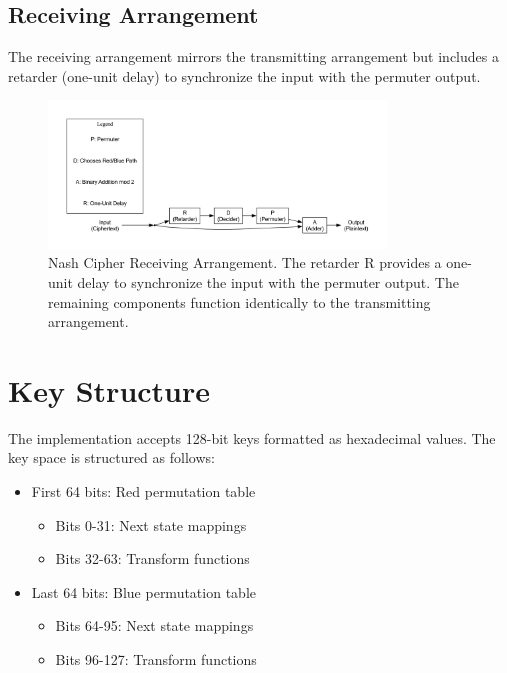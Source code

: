 \subsection{Receiving Arrangement}
The receiving arrangement mirrors the transmitting arrangement but includes a retarder (one-unit delay) to synchronize the input with the permuter output.

\begin{figure}[H]
    \centering
    \includegraphics[width=0.8\textwidth]{figures/receiver.pdf}
    \caption{Nash Cipher Receiving Arrangement. The retarder R provides a one-unit delay to synchronize the input with the permuter output. The remaining components function identically to the transmitting arrangement.}
    \label{fig:receiver}
\end{figure}

\section{Key Structure}

The implementation accepts 128-bit keys formatted as hexadecimal values. The key space is structured as follows:

\begin{itemize}
    \item First 64 bits: Red permutation table
    \begin{itemize}
        \item Bits 0-31: Next state mappings
        \item Bits 32-63: Transform functions
    \end{itemize}
    \item Last 64 bits: Blue permutation table
    \begin{itemize}
        \item Bits 64-95: Next state mappings
        \item Bits 96-127: Transform functions
    \end{itemize}
\end{itemize}

